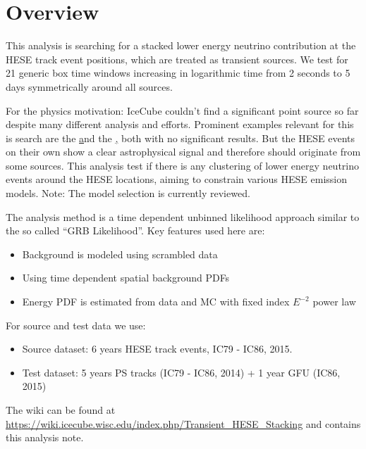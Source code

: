 

% 







\section{Overview}
This analysis is searching for a stacked lower energy neutrino contribution at the HESE track event positions, which are treated as transient sources.
We test for 21 generic box time windows increasing in logarithmic time from 2 seconds to 5 days symmetrically around all sources.

For the physics motivation: IceCube couldn't find a significant point source so far despite many different analysis and efforts.
Prominent examples relevant for this is search are the \href{time integrated 7 year point source search} and the \href{HESE 6 year point source search}, both with no significant results.
But the HESE events on their own show a clear astrophysical signal and therefore should originate from some sources.
This analysis test if there is any clustering of lower energy neutrino events around the HESE locations, aiming to constrain various HESE emission models.
\textcolor{nordred}{Note: The model selection is currently reviewed}.

The analysis method is a time dependent unbinned likelihood approach similar to the so called \enquote{GRB Likelihood}.
Key features used here are:
\begin{itemize}
  \item Background is modeled using scrambled data
  \item Using time dependent spatial background PDFs
  \item Energy PDF is estimated from data and MC with fixed index $E^{-2}$ power law
\end{itemize}

For source and test data we use:
\begin{itemize}
  \item Source dataset: 6 years HESE track events, IC79 - IC86, 2015.
  \item Test dataset: 5 years PS tracks (IC79 - IC86, 2014) + 1 year GFU (IC86, 2015)
\end{itemize}

The wiki can be found at \url{https://wiki.icecube.wisc.edu/index.php/Transient_HESE_Stacking} and contains this analysis note.


